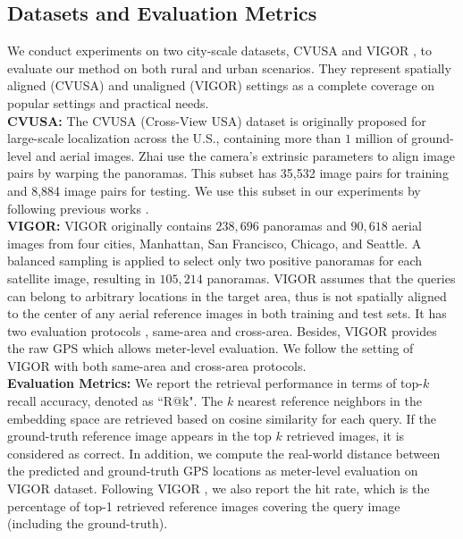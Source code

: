 \documentclass[10pt,twocolumn,letterpaper]{article}
\begin{document}
\subsection{Datasets and Evaluation Metrics}
We conduct experiments on two city-scale datasets, \ie CVUSA \cite{Zhai} and VIGOR \cite{zhu2021vigor}, to evaluate our method on both rural and urban scenarios. They represent spatially aligned (CVUSA) and unaligned (VIGOR) settings as a complete coverage on popular settings and practical needs.\\\textbf{CVUSA:} The CVUSA (Cross-View USA) \cite{workman2015wide} dataset is originally proposed for large-scale localization across the U.S., containing more than $1$ million of ground-level and aerial images. Zhai \etal \cite{Zhai} use the camera's extrinsic parameters to align image pairs by warping the panoramas. This subset has 35,532 image pairs for training and 8,884 image pairs for testing. We use this subset in our experiments by following previous works \cite{Zhai,CVM,SAFA}.\\
\textbf{VIGOR:} VIGOR \cite{zhu2021vigor} originally contains $238,696$ panoramas and $90,618$ aerial images from four cities, \ie Manhattan, San Francisco, Chicago, and Seattle. A balanced sampling is applied to select only two positive panoramas for each satellite image, resulting in $105,214$ panoramas. VIGOR assumes that the queries can belong to  arbitrary locations in the target area, thus is not spatially aligned to the center of any aerial reference images in both training and test sets. It has two evaluation protocols \cite{zhu2021vigor}, \ie same-area and cross-area. Besides, VIGOR provides the raw GPS which allows meter-level evaluation. We follow the setting of VIGOR with both same-area and cross-area protocols. \\
\textbf{Evaluation Metrics:}
We report the retrieval performance in terms of top-$k$ recall accuracy, denoted as ``R@k". The $k$ nearest reference neighbors in the embedding space are retrieved based on cosine similarity for each query. If the ground-truth reference image appears in the top $k$ retrieved images, it is considered as correct. In addition, we compute the real-world distance between the predicted and ground-truth GPS locations as meter-level evaluation on VIGOR \cite{zhu2021vigor} dataset.  Following VIGOR \cite{zhu2021vigor}, we also report the hit rate, which is the percentage of top-1 retrieved reference images covering the query image  (including the ground-truth).
\end{document}
